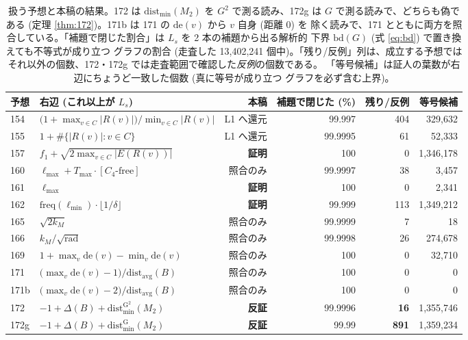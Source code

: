 \documentclass[paper=a4,fontsize=10.5pt,jafontsize=10.5pt]{jlreq}
\theoremstyle{plain}
\theoremstyle{definition}
\begin{document}
\begin{table}[t]
\centering
\caption{扱う予想と本稿の結果。172 は $\mathrm{dist}_{\min}(M_2)$ を
$G^2$ で測る読み、172g は $G$ で測る読みで、どちらも偽である (定理
\ref{thm:172})。171b は 171 の $\mathrm{de}(v)$ から $v$ 自身 (距離 0) を
除く読みで、171 とともに両方を照合している。「補題で閉じた割合」は $L_s$ を 2 本の補題から出る解析的
下界 $\mathrm{bd}(G)$ (式 \eqref{eq:bd}) で置き換えても不等式が成り立つ
グラフの割合 (走査した 13,402,241 個中)。「残り/反例」列は、成立する予想では
それ以外の個数、172・172g では走査範囲で確認した\emph{反例}の個数である。
「等号候補」は証人の葉数が右辺にちょうど一致した個数 (真に等号が成り立つ
グラフを必ず含む上界)。}
\label{tab:conj}
\small
\begin{tabular}{llrrrr}
\hline
予想 & 右辺 (これ以上が $L_s$) & 本稿 & 補題で閉じた (\%) & 残り/反例 & 等号候補 \\
\hline
154 & $\bigl(1 + \max_{v \in C}|R(v)|\bigr) \big/ \min_{v \in C}|R(v)|$ & L1 へ還元 & 99.997 & 404 & 329,632 \\
155 & $1 + \#\{|R(v)| : v \in C\}$ & L1 へ還元 & 99.9995 & 61 & 52,333 \\
157 & $f_1 + \sqrt{2 \max_{v \in C}|E(R(v))|}$ & \textbf{証明} & 100 & 0 & 1,346,178 \\
160 & $\ell_{\max} + T_{\max} \cdot [\text{$C_4$-free}]$ & 照合のみ & 99.9997 & 38 & 3,457 \\
161 & $\ell_{\max}$ & \textbf{証明} & 100 & 0 & 2,341 \\
162 & $\mathrm{freq}(\ell_{\min}) \cdot \lfloor 1/\delta \rfloor$ & \textbf{証明} & 99.999 & 113 & 1,349,212 \\
165 & $\sqrt{2 k_M}$ & 照合のみ & 99.9999 & 7 & 18 \\
166 & $k_M \big/ \sqrt{\mathrm{rad}}$ & 照合のみ & 99.9998 & 26 & 274,678 \\
169 & $1 + \max_v \mathrm{de}(v) - \min_v \mathrm{de}(v)$ & 照合のみ & 100 & 0 & 32,710 \\
171 & $\bigl(\max_v \mathrm{de}(v) - 1\bigr) \big/ \mathrm{dist_{avg}}(B)$ & 照合のみ & 100 & 0 & 0 \\
171b & $\bigl(\max_v \mathrm{de}(v) - 2\bigr) \big/ \mathrm{dist_{avg}}(B)$ & 照合のみ & 100 & 0 & 0 \\
172 & $-1 + \Delta(B) + \mathrm{dist^{G^2}_{\min}}(M_2)$ & \textbf{反証} & 99.9996 & \textbf{16} & 1,355,746 \\
172g & $-1 + \Delta(B) + \mathrm{dist^{G}_{\min}}(M_2)$ & \textbf{反証} & 99.99 & \textbf{891} & 1,359,234 \\
\hline
\end{tabular}
\end{table}
\end{document}
